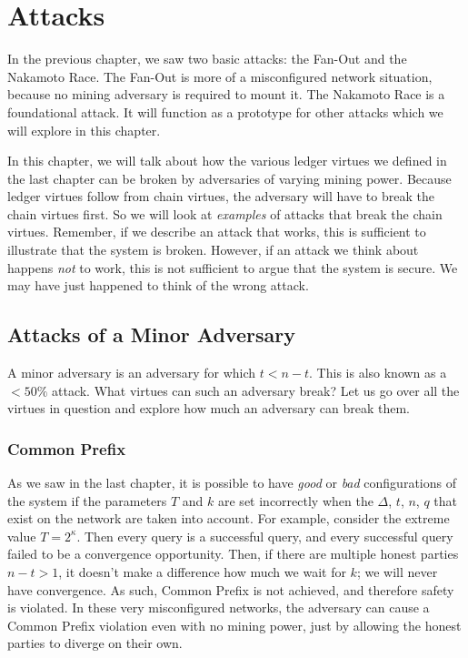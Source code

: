 \chapter{Attacks}

In the previous chapter, we saw two basic attacks: the Fan-Out and the Nakamoto Race.
The Fan-Out is more of a misconfigured network situation, because no mining adversary
is required to mount it. The Nakamoto Race is a foundational attack.
It will function as a prototype for other attacks which we will explore in this chapter.

In this chapter, we will talk about how the various ledger virtues we defined in the
last chapter can be broken by adversaries of varying mining power. Because ledger virtues
follow from chain virtues, the adversary will have to break the chain virtues first.
So we will look at \emph{examples} of attacks that break the chain virtues. Remember,
if we describe an attack that works, this is sufficient to illustrate that the system
is broken. However, if an attack we think about happens \emph{not} to work, this is not
sufficient to argue that the system is secure. We may have just happened to think of
the wrong attack.

\section{Attacks of a Minor Adversary}

A minor adversary is an adversary for which $t < n - t$. This is also known as
a $< 50\%$ attack. What virtues can such an adversary break? Let us go over all the
virtues in question and explore how much an adversary can break them.

\subsection*{Common Prefix}
As we saw in the last chapter, it is possible to have \emph{good} or
\emph{bad} configurations of the system if the parameters $T$ and $k$ are set incorrectly
when the $\Delta$, $t$, $n$, $q$ that exist on the network are taken into account.
For example, consider the extreme value
$T = 2^\kappa$. Then every query is a successful query, and every successful query
failed to be a convergence opportunity. Then, if there are multiple honest parties
$n - t > 1$, it doesn't make a difference how much we wait for $k$; we will never
have convergence. As such, Common Prefix is not achieved, and therefore safety is
violated. In these very misconfigured networks, the adversary can cause a Common
Prefix violation even with no mining power, just by allowing the honest parties
to diverge on their own.

